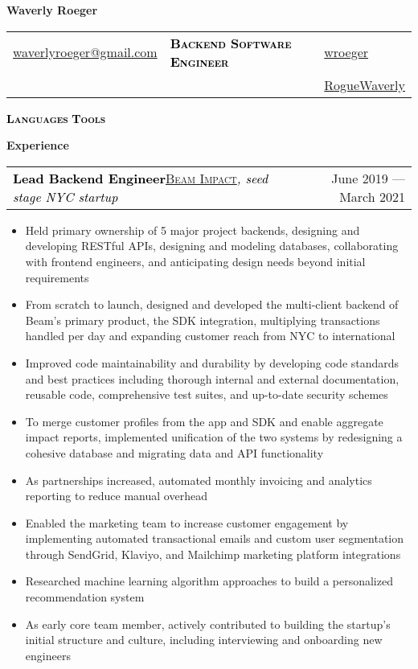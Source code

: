 \documentclass[letterpaper,11pt]{article}
\makeatletter
\newcommand{\boldsc}[1]{\textcolor{black}{\textbf{\textsc{#1}}}}
\newcommand{\resumeSpacing}{5pt}
\newcommand{\name}{Waverly Roeger}
\newcommand{\position}{Backend Software Engineer}
\newcommand{\addr}{\textcolor{black}{\faMapMarker}\space{New York City area (Stamford, CT)}}
\newcommand{\phone}{\textcolor{black}{\faPhone}\space{(806) 239-6854}}
\newcommand{\email}{\textcolor{black}{\faEnvelopeO}\space\href{mailto:waverlyroeger@gmail.com}{waverlyroeger@gmail.com}}
\newcommand{\linkedin}{\textcolor{black}{\faLinkedin}\space\href{https://www.linkedin.com/in/wroeger}{wroeger}}
\newcommand{\github}{\textcolor{black}{\faGithub}\space\href{https://github.com/RogueWaverly}{RogueWaverly}}
\newcommand{\resumeSection}[1]{
  \begin{flushleft}
  {\LARGE
  \textcolor{accent}{\textbf{#1}}
  \hrulefill}
  \end{flushleft}
}
\newcommand{\resumeSubsection}[5]{
  \begin{center}
	\begin{tabular*}{\textwidth}{l@{\extracolsep{\fill}}r}
	\large\textcolor{black}{\textbf{#1}}\normalsize\textcolor{black}{\quad\href{#4}{\textsc{#3}}\textit{#5}} & \small\textcolor{accent}{#2} \\
	\end{tabular*}
  \vspace{-\resumeSpacing}
  \vspace{-\resumeSpacing}
  \end{center}
}
\newenvironment{resumeItemize}{
  \addtolength{\leftmargini}{-\resumeSpacing}
  \begin{minipage}{0.99\textwidth}
  \begin{itemize}
  \small
}{
  \end{itemize}
  \vspace{0pt}
  \end{minipage}
  \normalsize
  \ \\
}
\newcommand{\resumeItem}[1]
{
  \raggedright
  \item{#1}
  \vspace{-\resumeSpacing}
}
\makeatother
\begin{document}
  \color{darkgray}
	\begin{center}\Huge{\color{black}\textbf{\name}}\end{center}
  \begin{center}
    \small
    {\setlength{\extrarowheight}{3pt}
    \begin{tabular*}{\textwidth}{L{0.25\textwidth}C{0.43\textwidth}R{0.25\textwidth}}
      \email & {\normalsize{\boldsc{\textcolor{accent}{\position}}}} & \linkedin \\
      \phone & \addr & \github \\
    \end{tabular*}}
  \end{center}
  \begin{center}
    \boldsc{Languages}{\small{}\quad}
    \boldsc{Tools}{\small{}}
  \end{center}
  \resumeSection{Experience}
  \resumeSubsection
  {Lead Backend Engineer}{June 2019 --- March 2021}
  {Beam Impact}{https://beamimpact.com/}{, seed stage NYC startup}
  \begin{resumeItemize}
    \resumeItem
    {Held primary ownership of 5 major project backends, designing and developing RESTful APIs, designing and modeling databases, collaborating with frontend engineers, and anticipating design needs beyond initial requirements}
    \resumeItem
    {From scratch to launch, designed and developed the multi-client backend of Beam's primary product, the SDK integration, multiplying transactions handled per day and expanding customer reach from NYC to international}
    \resumeItem
    {Improved code maintainability and durability by developing code standards and best practices including thorough internal and external documentation, reusable code, comprehensive test suites, and up-to-date security schemes}
    \resumeItem
    {To merge customer profiles from the app and SDK and enable aggregate impact reports, implemented unification of the two systems by redesigning a cohesive database and migrating data and API functionality}
    \resumeItem
    {As partnerships increased, automated monthly invoicing and analytics reporting to reduce manual overhead}
    \resumeItem
    {Enabled the marketing team to increase customer engagement by implementing automated transactional emails and custom user segmentation through SendGrid, Klaviyo, and Mailchimp marketing platform integrations}
    \resumeItem
    {Researched machine learning algorithm approaches to build a personalized recommendation system}
    \resumeItem
    {As early core team member, actively contributed to building the startup's initial structure and culture, including interviewing and onboarding new engineers}
  \end{resumeItemize}
\end{document}
